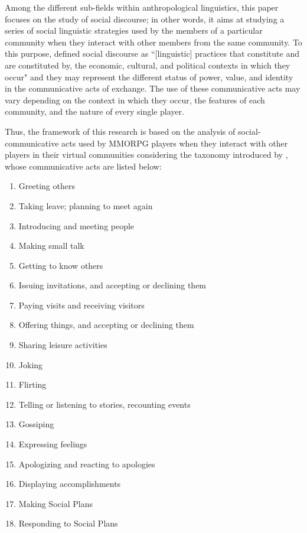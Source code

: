\documentclass[english]{textolivre}
\begin{document}
Among the different sub-fields within anthropological linguistics, this paper focuses on the study of social discourse; in other words, it aims at studying a series of social linguistic strategies used by the members of a particular community when they interact with other members from the same community. To this purpose, \textcite[p. 4]{farrell1998} defined social discourse as “[linguistic] practices that constitute and are constituted by, the economic, cultural, and political contexts in which they occur" and they may represent the different status of power, value, and identity in the communicative acts of exchange. The use of these communicative acts may vary depending on the context in which they occur, the features of each community, and the nature of every single player. 

Thus, the framework of this research is based on the analysis of social-communicative acts used by MMORPG players when they interact with other players in their virtual communities considering the taxonomy introduced by \textcite{guntermann1982}, whose communicative acts are listed below: 

\begin{enumerate}\label{list1}
\item Greeting others
\item Taking leave; planning to meet again
\item Introducing and meeting people
\item Making small talk
\item Getting to know others
\item Issuing invitations, and accepting or declining them
\item Paying visits and receiving visitors
\item Offering things, and accepting or declining them
\item Sharing leisure activities
\item Joking
\item Flirting
\item Telling or listening to stories, recounting events
\item Gossiping
\item Expressing feelings
\item Apologizing and reacting to apologies
\item Displaying accomplishments
\item Making Social Plans
\item Responding to Social Plans
\end{enumerate}
\end{document}
